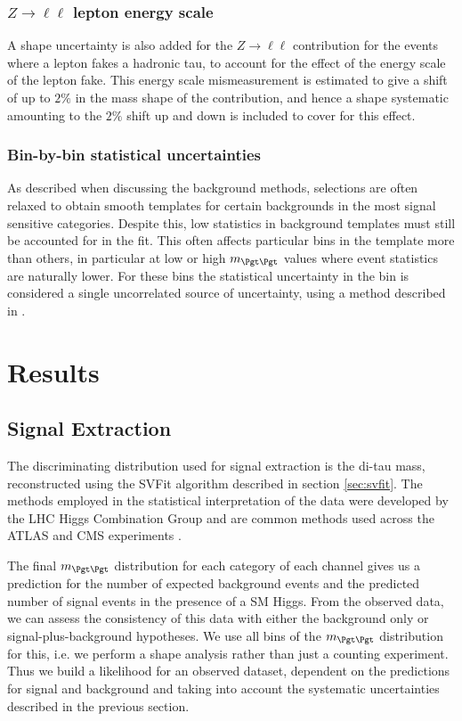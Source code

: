 \subsubsection{\textbf{$Z \to \ell\ell$ lepton energy scale}}
A shape uncertainty is also added for the $Z \to \ell\ell$ contribution for the
events where a lepton fakes a hadronic tau, to account for the effect of the energy 
scale of the lepton fake. This energy scale mismeasurement is estimated to give a 
shift of up to $2\%$ in the mass shape of the contribution, and hence a shape systematic amounting to the
$2\%$ shift up and down is included to cover for this effect.

\subsubsection{\textbf{Bin-by-bin statistical uncertainties}}
As described when discussing the background methods, selections are often
relaxed to obtain smooth templates for certain backgrounds in the most signal
sensitive categories. Despite this, low statistics in background templates must
still be accounted for in the fit. This often affects particular bins in the
template more than others, in particular at low or high $m_{\Pgt\Pgt}$ values
where event statistics are naturally lower. For these bins the statistical
uncertainty in the bin is considered a single uncorrelated source of
uncertainty, using a method described in \cite{Barlow1993219}. 



\section{Results}
\label{sec:results}

\subsection{Signal Extraction}
\label{sec:signalextraction}

The discriminating distribution used for signal extraction is the di-tau mass,
reconstructed using the SVFit algorithm described in section \ref{sec:svfit}. 
The methods employed in the statistical
interpretation of the data were developed by the LHC Higgs Combination Group and
are common methods used across the ATLAS and CMS experiments \cite{LHC-HCG-Report}.

The final $m_{\Pgt\Pgt}$ distribution for each category of each channel gives
us a prediction for the number of expected background events and the predicted number of signal
events in the presence of a \ac{SM} Higgs. From the observed data, we can assess
the consistency of this data with either the background only or
signal-plus-background hypotheses. We use all bins of the $m_{\Pgt\Pgt}$
distribution for this, i.e. we perform a shape analysis rather than just a
counting experiment. Thus we build a likelihood for an observed dataset,
dependent on the predictions for signal and background and taking into account
the systematic uncertainties described in the previous section.

